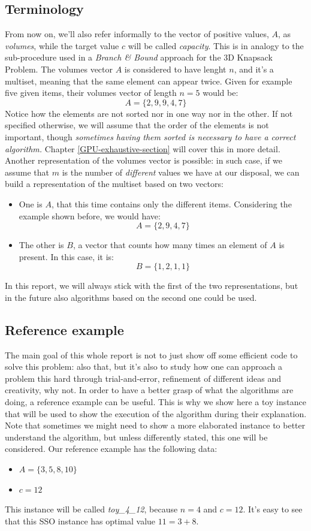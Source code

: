 \documentclass[12pt]{extarticle}
\begin{document}
\subsection{Terminology}
From now on, we'll also refer informally to the vector of positive values, $A$, as \emph{volumes}, while the target value $c$ will be called \emph{capacity}. This is in analogy to the sub-procedure used in a \emph{Branch \& Bound} approach for the 3D Knapsack Problem. The volumes vector $A$ is considered to have lenght $n$, and it's a multiset, meaning that the same element can appear twice.\newline
Given for example five given items, their volumes vector of length $n=5$ would be:
\[A = \{2, 9, 9, 4, 7\}\]
Notice how the elements are not sorted nor in one way nor in the other. If not specified otherwise, we will assume that the order of the elements is not important, though \emph{sometimes having them sorted is necessary to have a correct algorithm.} Chapter \ref{GPU-exhaustive-section} will cover this in more detail.\newline
Another representation of the volumes vector is possible: in such case, if we assume that $m$ is the number of \emph{different} values we have at our disposal, we can build a representation of the multiset based on two vectors:
\begin{itemize}
    \item One is $A$, that this time contains only the different items. Considering the example shown before, we would have:
    \[A = \{2, 9, 4, 7\}\]
    \item The other is $B$, a vector that counts how many times an element of $A$ is present. In this case, it is:
    \[B = \{1, 2, 1, 1\}\]
\end{itemize}
In this report, we will always stick with the first of the two representations, but in the future also algorithms based on the second one could be used.
\subsection{Reference example}
\label{section-reference-example}
The main goal of this whole report is not to just show off some efficient code to solve this problem: also that, but it's also to study how one can approach a problem this hard through trial-and-error, refinement of different ideas and creativity, why not. In order to have a better grasp of what the algorithms are doing, a reference example can be useful. This is why we show here a toy instance that will be used to show the execution of the algorithm during their explanation. Note that sometimes we might need to show a more elaborated instance to better understand the algorithm, but unless differently stated, this one will be considered.\newline
Our \label{marker-toy-4-12} reference example has the following data:
\begin{itemize}
    \item $A = \{3, 5, 8, 10\}$
    \item $c = 12$
\end{itemize}
This instance will be called \emph{toy\_4\_12}, because $n = 4$ and $c = 12$. It's easy to see that this SSO instance has optimal value $11 = 3 + 8$. 
\end{document}

